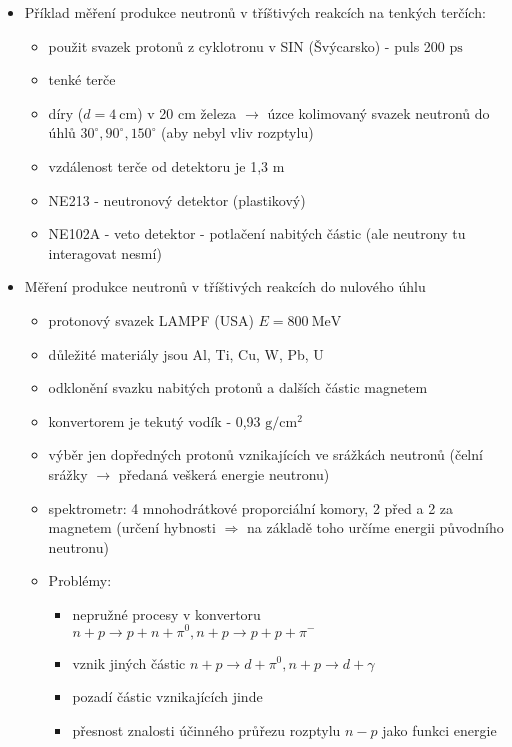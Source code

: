 \documentclass[../../main.tex]{subfiles}
\begin{document}
\begin{itemize}
	\item Příklad měření produkce neutronů v tříštivých reakcích na tenkých terčích:
	\begin{itemize}
		\item použit svazek protonů z cyklotronu v SIN (Švýcarsko) - puls 200 $\mathrm{ps}$
		\item tenké terče
		\item díry ($d = 4 ~\mathrm{cm}$) v 20 $\mathrm{cm}$ železa $\rightarrow$ úzce kolimovaný svazek neutronů do úhlů $30^{\circ}, 90^{\circ}, 150^{\circ}$ (aby nebyl vliv rozptylu)
		\item vzdálenost terče od detektoru je 1,3 $\mathrm{m}$
		\item NE213 - neutronový detektor (plastikový)
		\item NE102A - veto detektor - potlačení nabitých částic (ale neutrony tu interagovat nesmí)
	\end{itemize}
   \item Měření produkce neutronů v tříštivých reakcích do nulového úhlu
   \begin{itemize}
   	\item protonový svazek LAMPF (USA) $E = 800 ~\mathrm{MeV}$
   	\item důležité materiály jsou Al, Ti, Cu, W, Pb, U
   	\item odklonění svazku nabitých protonů a dalších částic magnetem
   	\item konvertorem je tekutý vodík - 0,93 $\mathrm{g/cm^2}$
   	\item výběr jen dopředných protonů vznikajících ve srážkách neutronů (čelní srážky $\rightarrow$ předaná veškerá energie neutronu)
   	\item spektrometr: 4 mnohodrátkové proporciální komory, 2 před a 2 za magnetem (určení hybnosti $\Rightarrow$ na základě toho určíme energii původního neutronu)
   	\item Problémy:
   	\begin{itemize}
   		\item nepružné procesy v konvertoru $n + p \rightarrow p + n + \pi^0 , n + p \rightarrow p +p + \pi^- $
   		\item vznik jiných částic $ n + p \rightarrow d + \pi^0 , n + p \rightarrow d + \gamma$
   		\item pozadí částic vznikajících jinde 
   		\item přesnost znalosti účinného průřezu rozptylu $n - p$ jako funkci energie 
   	\end{itemize}

\end{itemize}
\end{itemize}
\end{document}
